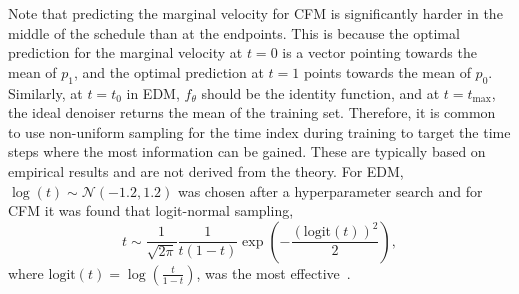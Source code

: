 Note that predicting the marginal velocity for CFM is significantly harder in the middle of the schedule than at the endpoints.
This is because the optimal prediction for the marginal velocity at $t=0$ is a vector pointing towards the mean of $p_1$, and the optimal prediction at $t=1$ points towards the mean of $p_0$.
Similarly, at $t=t_0$ in EDM, $f_\theta$ should be the identity function, and at $t=t_\text{max}$, the ideal denoiser returns the mean of the training set.
Therefore, it is common to use non-uniform sampling for the time index during training to target the time steps where the most information can be gained.
These are typically based on empirical results and are not derived from the theory.
For EDM, $\log(t) \sim \mathcal{N}(-1.2, 1.2)$ was chosen after a hyperparameter search and for CFM it was found that logit-normal sampling,
\begin{equation}
    t \sim \frac{1}{\sqrt{2\pi}}\frac{1}{t(1-t)}\exp\left(-\frac{(\text{logit}(t))^2}{2}\right),
\end{equation}
where $\text{logit}(t) = \log\left(\frac{t}{1-t}\right)$, was the most effective~\cite{SD3}.

